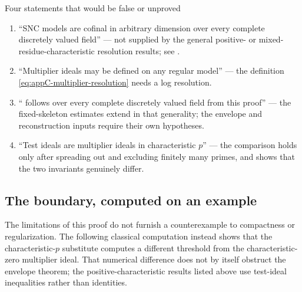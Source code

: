 \begin{warning}{Four statements that would be false or unproved}
\begin{enumerate}
\item ``SNC models are cofinal in arbitrary dimension over every complete
discretely valued field'' --- not supplied by the general positive- or
mixed-residue-characteristic resolution results; see
.
\item ``Multiplier ideals may be defined on any regular model'' --- the
definition \eqref{eq:appC-multiplier-resolution} needs a log resolution.
\item `` follows over every complete
discretely valued field from this proof'' --- the fixed-skeleton estimates
extend in that generality; the envelope and reconstruction inputs require
their own hypotheses.
\item ``Test ideals are multiplier ideals in characteristic $p$'' --- the
comparison  holds only after spreading out and
excluding finitely many primes, and
 shows that the two invariants genuinely differ.
\end{enumerate}
\end{warning}

\subsection{The boundary, computed on an example}

The limitations of this proof do not furnish a counterexample to
compactness or regularization.  The following classical computation instead
shows that the characteristic-$p$ substitute computes a different threshold
from the characteristic-zero multiplier ideal.  That numerical difference
does not by itself obstruct the envelope theorem; the positive-characteristic
results listed above use test-ideal inequalities rather than identities.

